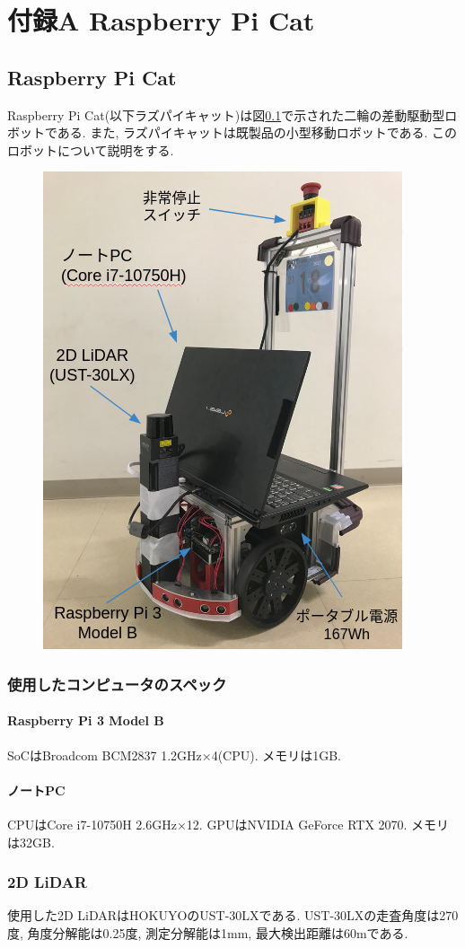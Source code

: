 \chapter*{付録A Raspberry Pi Cat}

\section{Raspberry Pi Cat}
Raspberry Pi Cat(以下ラズパイキャット)は図\ref{fig:raspicat}で示された二輪の差動駆動型ロボットである. 
また, ラズパイキャットは既製品の小型移動ロボットである.
このロボットについて説明をする.
\begin{figure}[h]
	\begin{center}
		\includegraphics[width=0.5\linewidth]{figs/raspicat.png}
		\caption{}
		\label{fig:raspicat}
	\end{center}
\end{figure}

\subsection{使用したコンピュータのスペック}

\subsubsection{Raspberry Pi 3 Model B}
SoCはBroadcom BCM2837 1.2GHz×4(CPU).
メモリは1GB.
\subsubsection{ノートPC}
CPUはCore i7-10750H 2.6GHz×12. 
GPUはNVIDIA GeForce RTX 2070.
メモリは32GB.

\subsection{2D LiDAR}
使用した2D LiDARはHOKUYOのUST-30LXである.
UST-30LXの走査角度は270度, 角度分解能は0.25度, 測定分解能は1mm, 最大検出距離は60mである.


